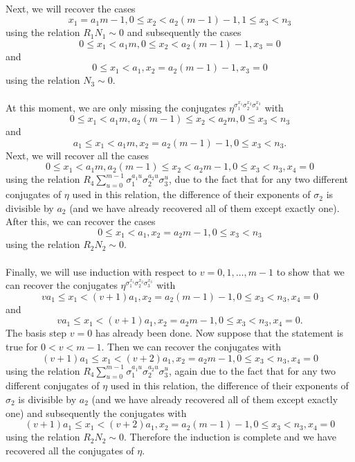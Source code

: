 \paragraph*{}
Next, we will recover the cases $$x_1=a_1m-1, 0\le x_2 < a_2(m-1)-1, 1\leq x_3 <n_3$$ using the relation $R_1N_1\sim 0$ and subsequently the cases $$0\leq x_1 < a_1m,  0\le x_2 < a_2(m-1)-1, x_3 = 0$$ and $$0\le x_1 < a_1, x_2 = a_2(m-1)-1, x_3 = 0$$ using the relation $N_3\sim 0$.

\paragraph*{}
At this moment, we are only missing the conjugates $\eta^{\sigma_1^{x_1}\sigma_2^{x_2}\sigma_3^{x_3}}$ with $$0\le x_1< a_1m, a_2(m-1)\le x_2 <a_2m, 0\le x_3<n_3$$ and $$a_1\le x_1< a_1m, x_2=a_2(m-1)-1, 0\le x_3<n_3.$$
Next, we will recover all the cases $$0\leq x_1 < a_1m, a_2(m-1)\leq x_2 < a_2m-1, 0\leq x_3 <n_3,x_4=0$$ %
using the relation $R_4\sum_{u=0}^{m-1}\sigma_1^{a_1u}\sigma_2^{a_2u}\sigma_3^u$, due to the fact that for any two different conjugates of $\eta$ used in this relation, the difference of their exponents of $\sigma_2$ is divisible by $a_2$ (and we have already recovered all of them except exactly one). %
 After this, we can recover the cases $$0\leq x_1 < a_1, x_2 = a_2m-1, 0\leq x_3 <n_3$$ using the relation $R_2N_2\sim 0$.
\paragraph*{}
Finally, we will use induction with respect to $v=0,1,\dots, m-1$ to show that we can recover the conjugates $\eta^{\sigma_1^{x_1}\sigma_2^{x_2}\sigma_3^{x_3}}$ with $$va_1\leq x_1 < (v+1)a_1,x_2=a_2(m-1)-1,0\le x_3<n_3,x_4=0$$ and $$va_1\leq x_1 < (v+1)a_1,x_2=a_2m-1,0\le x_3<n_3,x_4=0.$$
The basis step $v=0$ has already been done. Now suppose that the statement is true for $0<v<m-1$. Then we can recover the conjugates with $$(v+1)a_1\leq x_1 < (v+2)a_1,x_2=a_2m-1,0\le x_3<n_3,x_4=0$$
using the relation $R_4\sum_{u=0}^{m-1}\sigma_1^{a_1u}\sigma_2^{a_2u}\sigma_3^u$, again due to the fact that for any two different conjugates of $\eta$ used in this relation, the difference of their exponents of $\sigma_2$ is divisible by $a_2$ (and we have already recovered all of them except exactly one) and subsequently the conjugates with $$(v+1)a_1\leq x_1 < (v+2)a_1,x_2=a_2(m-1)-1,0\le x_3<n_3,x_4=0$$ using the relation $R_2N_2\sim 0$.
Therefore the induction is complete and we have recovered all the conjugates of $\eta$. 

